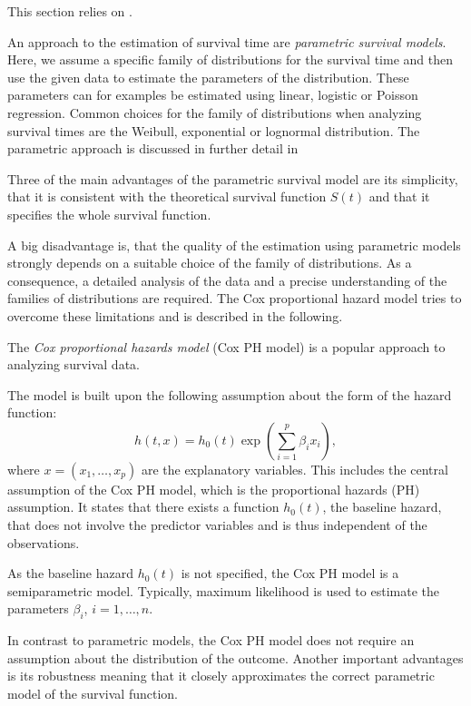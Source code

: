 \documentclass[12pt, a4paper]{article}
\theoremstyle{definition}
\theoremstyle{plain}
\numberwithin{equation}{section}
\numberwithin{figure}{section}
\numberwithin{table}{section}
\begin{document}
	This section relies on \citet*{sabook}.
	
	An approach to the estimation of survival time are \emph{parametric survival models}.
	Here, we assume a specific family of distributions for the survival time and then use the given data to estimate the parameters of the distribution.
	These parameters can for examples be estimated using linear, logistic or Poisson regression.
	Common choices for the family of distributions when analyzing survival times are the Weibull, exponential or lognormal distribution.
	The parametric approach is discussed in further detail in \citet*{sabook}
	
	Three of the main advantages of the parametric survival model are its simplicity,  that it is consistent with the theoretical survival function $S(t)$ and that it specifies the whole survival function.
	
	A big disadvantage is, that the quality of the estimation using parametric models strongly depends on a suitable choice of the family of distributions.
	As a consequence, a detailed analysis of the data and a precise understanding of the families of distributions are required.
	The Cox proportional hazard model tries to overcome these limitations and is described in the following.
	
	The \emph{Cox proportional hazards model} (Cox PH model) is a popular approach to analyzing survival data.
	
	The model is built upon the following assumption about the form of the hazard function:
	\begin{equation*}
	h(t,x) = h_0(t) \exp \left(\sum_{i=1}^p \beta_i x_i\right),
	\end{equation*}
	where $x=(x_1,\dots,x_p)$ are the explanatory variables.
	This includes the central assumption of the Cox PH model, which is the proportional hazards (PH) assumption.
	It states that there exists a function $h_0(t)$, the baseline hazard, that does not involve the predictor variables and is thus independent of the observations.
	
	As the baseline hazard $h_0(t)$ is not specified, the Cox PH model is a semiparametric model.
	Typically, maximum likelihood is used to estimate the parameters $\beta_i$, $i=1,\dots ,n$.
	
	In contrast to parametric models, the Cox PH model does not require an assumption about the distribution of the outcome.
	Another important advantages is its robustness meaning that it closely approximates the correct parametric model of the survival function.
	
\end{document}

